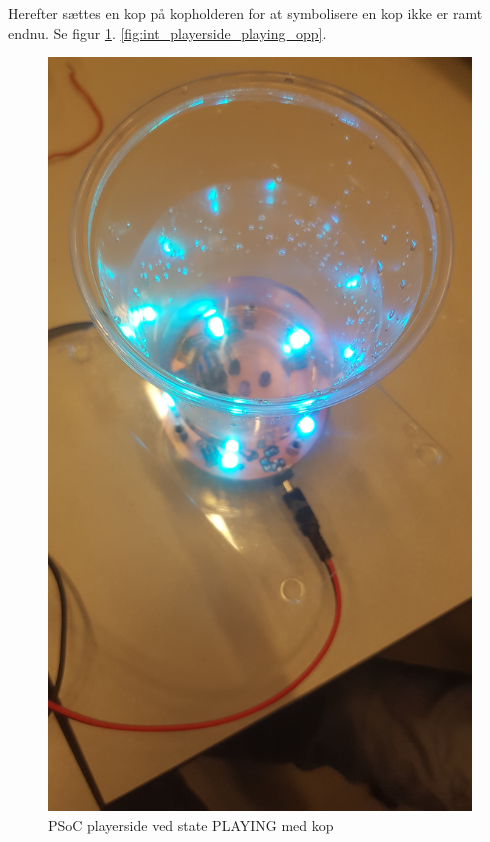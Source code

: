 \documentclass[Integrationstest/Integrationstest_main.tex]{subfiles}
\begin{document}
Herefter sættes en kop på kopholderen for at symbolisere en kop ikke er ramt endnu. Se figur \ref{fig:int_playerside_playing_my}.
\ref{fig:int_playerside_playing_opp}.
\begin{figure}[H]
    \centering
    \includegraphics[width=\textwidth]{Integrationstest/Integrationstest_PlayerSide/graphics/CupSensorInt/PLAYING_my_col.jpg}
    \caption{PSoC playerside ved state PLAYING med kop}
    \label{fig:int_playerside_playing_my}
\end{figure}
\end{document}
